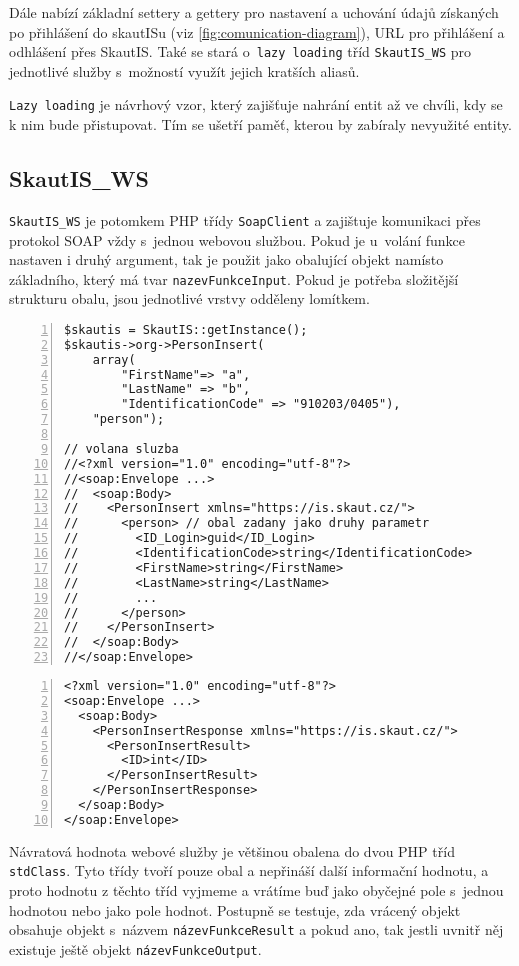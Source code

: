 \documentclass[thesis=B,czech]{FITthesis}[2012/04/27]
\begin{document}
Dále nabízí základní settery a gettery pro nastavení a uchování údajů získaných po přihlášení do skautISu (viz \ref{fig:comunication-diagram}), URL pro přihlášení a odhlášení přes SkautIS. Také se stará o~\texttt{lazy loading} tříd \texttt{SkautIS\_WS} pro jednotlivé služby s~možností využít jejich kratších aliasů.

\texttt{Lazy loading} je návrhový vzor, který zajišťuje nahrání entit až ve chvíli, kdy se k nim bude přistupovat. Tím se ušetří paměť, kterou by zabíraly nevyužité entity.

\subsection{SkautIS\_WS}
\texttt{SkautIS\_WS} je potomkem PHP třídy \texttt{SoapClient} a zajištuje komunikaci přes protokol SOAP vždy s~jednou webovou službou. Pokud je u~volání funkce nastaven i druhý argument, tak je použit jako obalující objekt namísto základního, který má tvar \texttt{nazevFunkceInput}. Pokud je potřeba složitější strukturu obalu, jsou jednotlivé vrstvy odděleny lomítkem.

\begin{lstlisting}[caption=volání webové služby s~nestandardním obalem, label=SkautISAdvanceCover, numbers=left]
$skautis = SkautIS::getInstance();
$skautis->org->PersonInsert(
	array(
		"FirstName"=> "a",
		"LastName" => "b",
		"IdentificationCode" => "910203/0405"),
	"person");

// volana sluzba
//<?xml version="1.0" encoding="utf-8"?>
//<soap:Envelope ...>
//  <soap:Body>
//    <PersonInsert xmlns="https://is.skaut.cz/">
//      <person> // obal zadany jako druhy parametr
//        <ID_Login>guid</ID_Login>
//        <IdentificationCode>string</IdentificationCode>
//        <FirstName>string</FirstName>
//        <LastName>string</LastName>
//        ...
//      </person>
//    </PersonInsert>
//  </soap:Body>
//</soap:Envelope>	
\end{lstlisting}


\begin{lstlisting}[caption=návratová hodnota webové služby, numbers=left]
<?xml version="1.0" encoding="utf-8"?>
<soap:Envelope ...>
  <soap:Body>
    <PersonInsertResponse xmlns="https://is.skaut.cz/">
      <PersonInsertResult>
        <ID>int</ID>
      </PersonInsertResult>
    </PersonInsertResponse>
  </soap:Body>
</soap:Envelope>
\end{lstlisting}

Návratová hodnota webové služby je většinou obalena do dvou PHP tříd \texttt{stdClass}. Tyto třídy tvoří pouze obal a nepřináší další informační hodnotu, a proto hodnotu z těchto tříd vyjmeme a vrátíme buď jako obyčejné pole s~jednou hodnotou nebo jako pole hodnot. Postupně se testuje, zda vrácený objekt obsahuje objekt s~názvem \texttt{názevFunkceResult} a pokud ano, tak jestli uvnitř něj existuje ještě objekt \texttt{názevFunkceOutput}.
\end{document}
